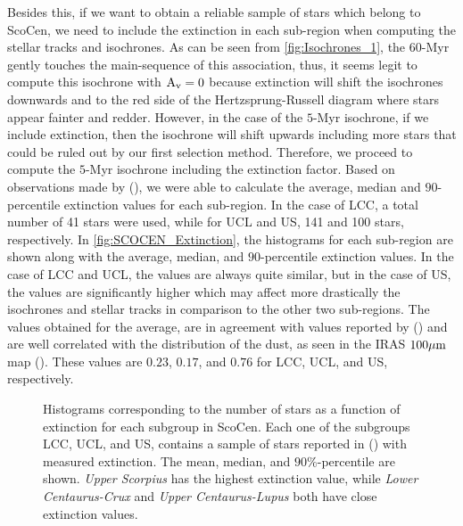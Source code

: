Besides this, if we want to obtain a reliable sample of stars which belong to ScoCen, we need to include the extinction in each sub-region when computing the stellar tracks and isochrones. As can be seen from \autoref{fig:Isochrones_1}, the $60$-Myr gently touches the main-sequence of this association, thus, it seems legit to compute this isochrone with $\textnormal{A}_\textnormal{v} = 0$ because extinction will shift the isochrones downwards and to the red side of the Hertzsprung-Russell diagram where stars appear fainter and redder. However, in the case of the $5$-Myr isochrone, if we include extinction, then the isochrone will shift upwards including more stars that could be ruled out by our first selection method. Therefore, we proceed to compute the $5$-Myr isochrone including the extinction factor. Based on observations made by  (\citeyear{1989A&A...216...44D}), we were able to calculate the average, median and $90$-percentile extinction values for each sub-region. In the case of LCC, a total number of 41 stars were used, while for UCL and US, 141 and 100 stars, respectively. In \autoref{fig:SCOCEN_Extinction}, the histograms for each sub-region are shown along with the average, median, and $90$-percentile extinction values. In the case of LCC and UCL, the values are always quite similar, but in the case of US, the values are significantly higher which may affect more drastically the isochrones and stellar tracks in comparison to the other two sub-regions. The values obtained for the average, are in agreement with values reported by  (\citeyear{2018MNRAS.tmp..210W}) and are well correlated with the distribution of the dust, as seen in the IRAS $100 \mu \textnormal{m}$ map  (\citeyear{1989A&A...216...44D}). These values are $0.23$, $0.17$, and $0.76$ for LCC, UCL, and US, respectively.\\     

\begin{figure}[!ht]
\centering
\caption{\scriptsize{Histograms corresponding to the number of stars as a function of extinction for each subgroup in ScoCen. Each one of the subgroups LCC, UCL, and US, contains a sample of stars reported in  (\citeyear{1989A&A...216...44D}) with measured extinction. The mean, median, and $90\%$-percentile are shown. \textit{Upper Scorpius} has the highest extinction value, while \textit{Lower Centaurus-Crux} and \textit{Upper Centaurus-Lupus} both have close extinction values.}}
\label{fig:SCOCEN_Extinction}
\end{figure}

